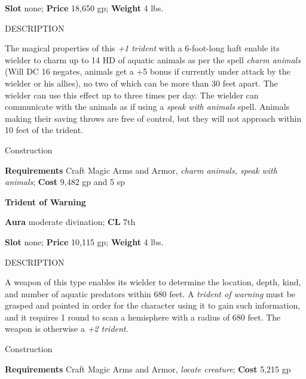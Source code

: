 \textbf{Slot} none; \textbf{Price} 18,650 gp; \textbf{Weight} 4 lbs.
				
DESCRIPTION
				
The magical properties of this \textit{+1 trident} with a 6-foot-long haft enable its wielder to charm up to 14 HD of aquatic animals as per the spell \textit{charm animals} (Will DC 16 negates, animals get a +5 bonus if currently under attack by the wielder or his allies), no two of which can be more than 30 feet apart. The wielder can use this effect up to three times per day. The wielder can communicate with the animals as if using a \textit{speak with animals} spell. Animals making their saving throws are free of control, but they will not approach within 10 feet of the trident. 
				
Construction
				
\textbf{Requirements} Craft Magic Arms and Armor, \textit{charm animals, speak with animals}; \textbf{Cost }9,482 gp and 5 sp
				
\textbf{Trident of Warning}
				
\textbf{Aura} moderate divination;\textbf{ CL }7th
				
\textbf{Slot} none; \textbf{Price} 10,115 gp; \textbf{Weight} 4 lbs.
				
DESCRIPTION
				
A weapon of this type enables its wielder to determine the location, depth, kind, and number of aquatic predators within 680 feet. A \textit{trident of warning} must be grasped and pointed in order for the character using it to gain such information, and it requires 1 round to scan a hemisphere with a radius of 680 feet. The weapon is otherwise a \textit{+2 trident}. 
				
Construction
				
\textbf{Requirements} Craft Magic Arms and Armor, \textit{locate creature}; \textbf{Cost }5,215 gp	
